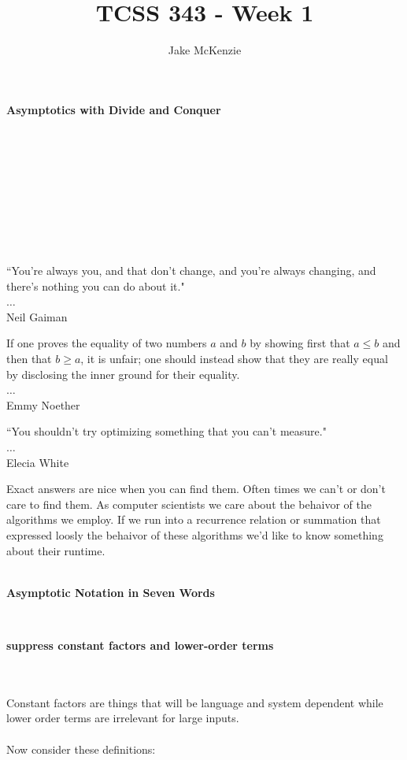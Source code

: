 \documentclass[12pt]{article}
\begin{document}
\title{TCSS 343 - Week 1}
\author{Jake McKenzie}
\maketitle
\noindent\centerline{\textbf{Asymptotics with Divide and Conquer}}\\\\\\\\\\\\\\\\
\begin{center}
    ``You're always you, and that don't change, and you're always changing, and there's nothing you can do about it." \\$\dots$\\ Neil Gaiman
\end{center}
\begin{center}
    If one proves the equality of two numbers $a$ and $b$ by showing first that $a \leq b$ and then that $b \geq a$, it is unfair; one should instead show that they are really equal by disclosing the inner ground for their equality. \\$\dots$\\Emmy Noether
\end{center}
\begin{center}
    ``You shouldn't try optimizing something that you can't measure." \\$\dots$\\ Elecia White
\end{center}
    \newpage
Exact answers are nice when you can find them. Often times we can't or don't care to find them. As computer scientists we care about the behaivor of the algorithms we employ. If we run into a recurrence relation or summation that expressed loosly the behaivor of these algorithms we'd like to know something about their runtime.\\\\
\centerline{\textbf{Asymptotic Notation in Seven Words}}\\
\centerline{\textbf{suppress constant factors and lower-order terms}}\\\\
Constant factors are things that will be language and system dependent while lower order terms are irrelevant for large inputs.\\\\
Now consider these definitions:\\
\end{document}
